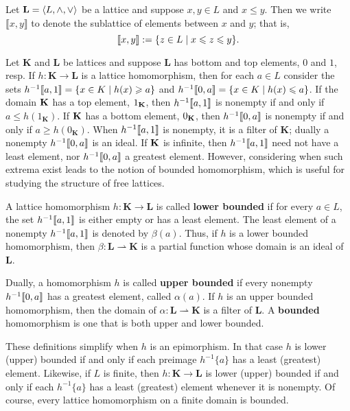 Let $\mathbf{L} = \langle L, \wedge, \vee\rangle$ be a lattice and suppose $x, y \in L$
and $x \leq y$. Then we write $\llbracket x, y \rrbracket$ to denote the 
sublattice of elements between $x$ and $y$; that is, 
\[
\llbracket x, y \rrbracket := \{z \in L \mid x \leqslant z \leqslant y \}.
\]

Let $\mathbf K$ and $\mathbf L$ be lattices and suppose $\mathbf L$ has bottom 
and top elements, $0$ and $1$, resp.  
If $h \colon \mathbf K \to \mathbf L$ is a lattice homomorphism, then for 
each $a \in L$ consider the sets 
$h^{-1}\llbracket a, 1 \rrbracket = \{x \in K \mid h(x) \geqslant a\}$ and
$h^{-1}\llbracket 0, a \rrbracket = \{x \in K \mid h(x) \leqslant a \}$. 
If the domain $\mathbf{K}$ has a top element, $1_{\mathbf{K}}$, 
then $h^{-1}\llbracket a, 1 \rrbracket$ is nonempty if and only if 
$a \leq h(1_{\mathbf K})$.  
If $\mathbf{K}$ has a bottom element, $0_{\mathbf{K}}$, 
then $h^{-1}\llbracket 0, a \rrbracket$ is nonempty 
if and only if $a \geq h(0_{\mathbf K})$.
When $h^{-1}\llbracket a, 1 \rrbracket$ is nonempty,
it is a filter of $\mathbf K$; dually a nonempty $h^{-1}\llbracket 0, a \rrbracket$ is an ideal. 
If $\mathbf{K}$ is infinite, then 
$h^{-1}\llbracket a, 1 \rrbracket$ need not have a least element, nor 
$h^{-1}\llbracket 0, a \rrbracket$ a greatest element. However, 
considering when such extrema exist leads to the notion of
bounded homomorphism, which is useful for studying the structure of free lattices.


A lattice homomorphism $h \colon \mathbf K \to \mathbf L$ is called 
\textbf{lower bounded} if for every $a \in L$, the set $h^{-1} \llbracket a, 1 \rrbracket$ 
is either empty or has a least element. 
The least element of a nonempty $h^{-1}\llbracket a, 1\rrbracket$ is denoted by $\beta(a)$.
Thus, if $h$ is a lower bounded homomorphism, then 
$\beta \colon \mathbf L \rightharpoonup \mathbf K$ 
is a partial function whose domain is an ideal of $\mathbf L$. 

Dually, a homomorphism $h$ is called \textbf{upper bounded} if every 
nonempty $h^{-1}\llbracket 0, a \rrbracket$ has a greatest element, called $\alpha (a)$.
If $h$ is an upper bounded homomorphism, then the domain of 
$\alpha \colon \mathbf L \rightharpoonup \mathbf K$ 
is a filter of $\mathbf L$.  
A \textbf{bounded} homomorphism is one that is both upper and lower bounded.

These definitions simplify when $h$ is an epimorphism.
In that case $h$ is lower (upper) bounded if and only if each preimage 
$h^{-1}\{ a \}$ has a least (greatest) element.
Likewise, if $L$ is finite, then $h \colon \mathbf K \to \mathbf L$ is lower (upper)
bounded if and only if each $h^{-1}\{a\}$ has a least (greatest) element whenever 
it is nonempty. Of course, every lattice homomorphism on a finite domain is
bounded.

